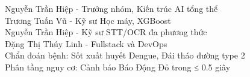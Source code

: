 ﻿\documentclass{article}
\begin{document}
Nguyễn Trần Hiệp - Trưởng nhóm, Kiến trúc AI tổng thể\\
Trương Tuấn Vũ - Kỹ sư Học máy, XGBoost\\
Nguyễn Trần Hiệp - Kỹ sư STT/OCR đa phương thức\\
Đặng Thị Thúy Linh - Fullstack và DevOps\\
Chẩn đoán bệnh: Sốt xuất huyết Dengue, Đái tháo đường type 2\\
Phân tầng nguy cơ: Cảnh báo Báo Động Đỏ trong ≤ 0.5 giây
\end{document}
